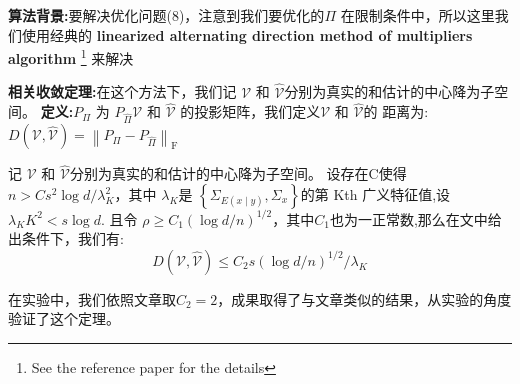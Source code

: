 \documentclass[lang=cn,11pt,a4paper]{elegantpaper}
\newcommand{\Blue}[1]{\textcolor[rgb]{0,0,0.803}{#1}}
\begin{document}
\textbf{\Blue{算法背景:}}要解决优化问题(8)，注意到我们要优化的$ \Pi$ 在限制条件中，所以这里我们使用经典的  \textbf{linearized alternating direction method of multipliers algorithm}\cite{zhang2011unified} \footnote{See the reference paper for the details} 来解决 

\textbf{\Blue{相关收敛定理:}}在这个方法下，我们记 $\mathcal{V}$ 和 $\hat{\mathcal{V}}$分别为真实的和估计的中心降为子空间。 
\newline
\textbf{定义:}$P_{\Pi}$ 为 $P_{\hat{\Pi}}\mathcal{V}$ 和 $\hat{\mathcal{V}}$ 的投影矩阵，我们定义$\mathcal{V}$ 和 $\hat{\mathcal{V}}$的 距离为: $D(\mathcal{V}, \hat{\mathcal{V}})=\left\|P_{\Pi}-P_{\hat{\Pi}}\right\|_{\mathrm{F}}$  

\begin{theorem}
记 $\mathcal{V}$ 和 $\hat{\mathcal{V}}$分别为真实的和估计的中心降为子空间。 设存在C使得$ n> C s^{2} \log d / \lambda_{K}^{2}$，其中   $ \lambda_K$是 $\left\{\Sigma_{E(x \mid y)}, \Sigma_{x}\right\}$的第 Kth 广义特征值,设$\lambda_{K} K^{2}<s \log d .$ 且令 $\rho \geqslant C_{1}(\log d / n)^{1 / 2}$，其中$C_1$也为一正常数,那么在文中给出条件下，我们有:
$$D(\mathcal{V}, \hat{\mathcal{V}}) \leqslant C_{2} s(\log d / n)^{1 / 2} / \lambda_{K}$$
\end{theorem}
在实验中，我们依照文章取$C_2 = 2$，成果取得了与文章类似的结果，从实验的角度验证了这个定理。
\end{document}
